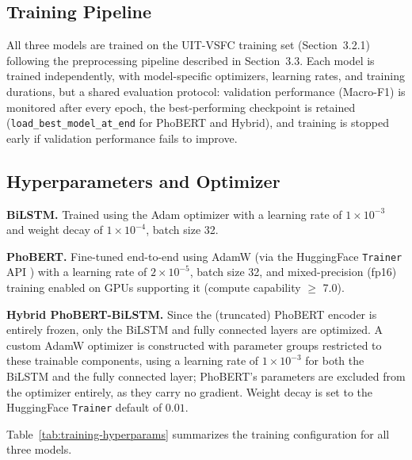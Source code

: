 \documentclass[12pt]{report} %
\begin{document}
\subsection{Training Pipeline}
All three models are trained on the UIT-VSFC training set (Section~3.2.1) following the preprocessing pipeline described in Section~3.3. Each model is trained independently, with model-specific optimizers, learning rates, and training durations, but a shared evaluation protocol: validation performance (Macro-F1) is monitored after every epoch, the best-performing checkpoint is retained (\texttt{load\_best\_model\_at\_end} for PhoBERT and Hybrid), and training is stopped early if validation performance fails to improve.

\subsection{Hyperparameters and Optimizer}

\textbf{BiLSTM.} Trained using the Adam optimizer \cite{kingma2015adam} with a learning rate of $1\times10^{-3}$ and weight decay of $1\times10^{-4}$, batch size 32.

\textbf{PhoBERT.} Fine-tuned end-to-end using AdamW \cite{loshchilov2019adamw} (via the HuggingFace \texttt{Trainer} API \cite{wolf2020transformers}) with a learning rate of $2\times10^{-5}$, batch size 32, and mixed-precision (fp16) training enabled on GPUs supporting it (compute capability $\geq$ 7.0).

\textbf{Hybrid PhoBERT-BiLSTM.} Since the (truncated) PhoBERT encoder is entirely frozen, only the BiLSTM and fully connected layers are optimized. A custom AdamW \cite{loshchilov2019adamw} optimizer is constructed with parameter groups restricted to these trainable components, using a learning rate of $1\times10^{-3}$ for both the BiLSTM and the fully connected layer; PhoBERT's parameters are excluded from the optimizer entirely, as they carry no gradient. Weight decay is set to the HuggingFace \texttt{Trainer} \cite{wolf2020transformers} default of $0.01$.

Table~\ref{tab:training-hyperparams} summarizes the training configuration for all three models.
\end{document}
